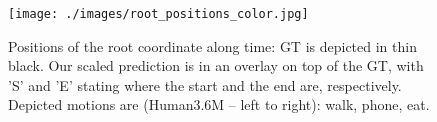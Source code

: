 \begin{figure}[b]
\centering
\texttt{[image: ./images/root\_positions\_color.jpg]}
\vspace{-20pt}
\caption{ 
Positions of the root coordinate along time: 
GT is depicted in thin black.  
Our scaled prediction is in an overlay on top of the GT, with  'S' and 'E' stating where the start and the end are, respectively.
Depicted motions are (Human3.6M -- left to right): walk, phone, eat.
}
\label{fig:root_pos}
\vspace{-5pt}
\end{figure}

